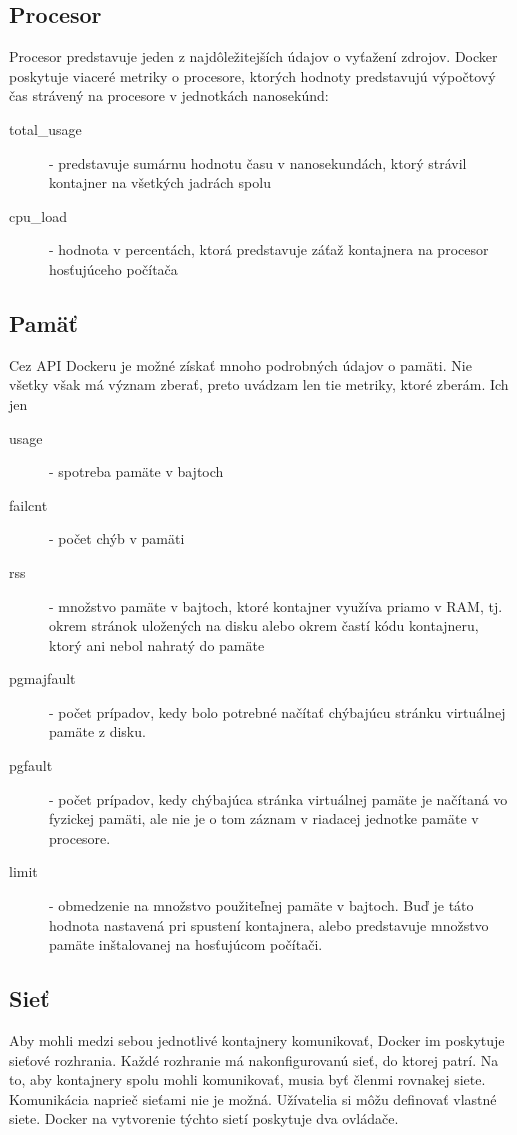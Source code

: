 \documentclass[printed,11pt,twoside,color,cover,table]{fithesis3}
\begin{document}
\subsection{Procesor}
Procesor predstavuje jeden z najdôležitejších údajov o vyťažení zdrojov. Docker poskytuje viaceré metriky o procesore, ktorých hodnoty 
predstavujú výpočtový čas strávený na procesore v jednotkách nanosekúnd: 
\begin{description}
\item[total\_usage] - predstavuje sumárnu hodnotu času v nanosekundách, ktorý strávil kontajner na všetkých jadrách spolu
\item[cpu\_load] - hodnota v percentách, ktorá predstavuje záťaž kontajnera na procesor hosťujúceho počítača
\end{description}

\subsection{Pamäť}
Cez API Dockeru je možné získať mnoho podrobných údajov o pamäti. Nie všetky však má význam zberať, preto uvádzam len tie metriky, ktoré zberám. Ich jen
\begin{description}
\item[usage] - spotreba pamäte v bajtoch
\item[failcnt] - počet chýb v pamäti
\item[rss] - množstvo pamäte v bajtoch, ktoré kontajner využíva priamo v RAM, tj. okrem stránok uložených na disku alebo okrem častí kódu kontajneru, ktorý ani nebol nahratý do pamäte
\item[pgmajfault] - počet prípadov, kedy bolo potrebné načítať chýbajúcu stránku virtuálnej pamäte z disku.
\item[pgfault] - počet prípadov, kedy chýbajúca stránka virtuálnej pamäte je načítaná vo fyzickej pamäti, ale nie je o tom záznam v riadacej jednotke pamäte v procesore.
\item[limit] - obmedzenie na množstvo použiteľnej pamäte v bajtoch. Buď je táto hodnota nastavená pri spustení kontajnera, alebo predstavuje množstvo pamäte inštalovanej na hosťujúcom počítači.
\end{description}

\subsection{Sieť}
Aby mohli medzi sebou jednotlivé kontajnery komunikovať, Docker im poskytuje sieťové rozhrania. Každé rozhranie má nakonfigurovanú sieť,
do ktorej patrí. Na to, aby kontajnery spolu mohli komunikovať, musia byť členmi rovnakej siete. Komunikácia naprieč sieťami nie je možná.
Užívatelia si môžu definovať vlastné siete. Docker na vytvorenie týchto sietí poskytuje dva ovládače.
\end{document}

